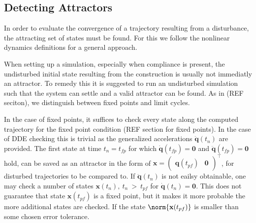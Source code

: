 







\subsection{Detecting Attractors}

In order to evaluate the convergence of a trajectory resulting from a disturbance, the attracting set of states must be found. For this we follow the nonlinear dynamics definitions for a general approach.


When setting up a simulation, especially when compliance is present, the undisturbed initial state resulting from the construction is usually not immediatly an attractor. To remedy this it is suggested to run an undisturbed simulation such that the system can settle and a valid attractor can be found. As in (REF seciton), we distinguish between fixed points and limit cycles. 

In the case of fixed points, it suffices to check every state along the computed trajectory for the fixed point condition (REF section for fixed points).  In the case of DDE checking this is trivial as the generalized accelerations $\ddot{\mathbf{q}}(t_n)$ are provided. 
The first state at time $t_n = t_{fp}$ for which $\dot{\mathbf{q}}(t_{fp}) = \mathbf{0}$ and $\ddot{\mathbf{q}}(t_{fp}) = \mathbf{0}$ hold, can be saved as an attractor in the form of $\mathbf{x} = \begin{pmatrix}\mathbf{q}(t_{pf})&\mathbf{0}\end{pmatrix}^\intercal$, for disturbed trajectories to be compared to. 
If $\ddot{\mathbf{q}}(t_n)$ is not eailsy obtainable, one may check a number of states $\mathbf{x}(t_n),\ t_n\ >\ t_{pf}$ for $\dot{\mathbf{q}}(t_n) = \mathbf{0}$. This does not guarantee that state $\mathbf{x}(t_{pf})$ is a fixed point, 
but it makes it more probable the more additional states are checked. 
If the state $\norm{\mathbf{x}(t_{pf})}$ is smaller than some chosen error tolerance.  

